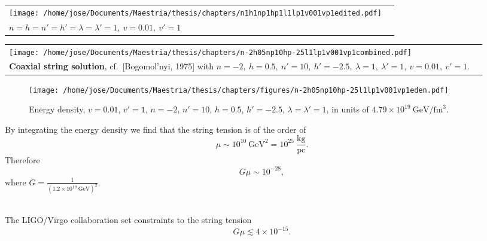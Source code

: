 \documentclass[14pt]{beamer}
\begin{document}
\begin{frame}

\begin{tabular}{@{} *{2}{C{\linewidth}} }
\texttt{[image: /home/jose/Documents/Maestria/thesis/chapters/n1h1np1hp1l1lp1v001vp1edited.pdf]} \\[\abovecaptionskip]
$n = h = n' = h'  = \lambda=\lambda' = 1,\ v =0.01,\ v' = 1 $
\end{tabular}
\end{frame}

\begin{frame}

\begin{tabular}{@{} *{2}{C{\linewidth}} }
\texttt{[image: /home/jose/Documents/Maestria/thesis/chapters/n-2h05np10hp-25l1lp1v001vp1combined.pdf]} \\[\abovecaptionskip]
\textbf{Coaxial string solution}, cf.\ [Bogomol'nyi, 1975] with $n = -2,\ h =0.5,\ n' = 10,\ h' = -2.5,\  \lambda=1,\ \lambda' = 1,\ v =0.01,\ v' = 1$.
\end{tabular}
\end{frame}



\begin{frame}
\begin{figure}
	\centering
	\texttt{[image: /home/jose/Documents/Maestria/thesis/chapters/figures/n-2h05np10hp-25l1lp1v001vp1eden.pdf]}
	\caption{Energy density, $v = 0.01$, $v'=1$, $n=-2$, $n'=10$, $h=0.5$, $h'=-2.5$, $\lambda=\lambda'=1$, in units of $4.79\times 10^{19}\ \text{GeV}/\text{fm}^3$.}
	\label{fig:edencoaxial}
\end{figure}
\end{frame}

\begin{frame}
By integrating the energy density we find that the string tension is of the order of
\begin{equation*}
	\mu \sim 10^{10}\ \text{GeV}^2 = 10^{25} \ \frac{\text{kg}}{\text{pc}}.
\end{equation*}
Therefore
\begin{equation*}
	G\mu \sim 10^{-28},
\end{equation*}
where $G = \frac{1}{(1.2\times 10^{19}\ \text{GeV})^2}$.\\~\

The LIGO/Virgo collaboration set constraints to the string tension
\begin{equation*}
		G\mu \lesssim 4\times 10^{-15}.
	\end{equation*}		
\end{frame}
\end{document}
